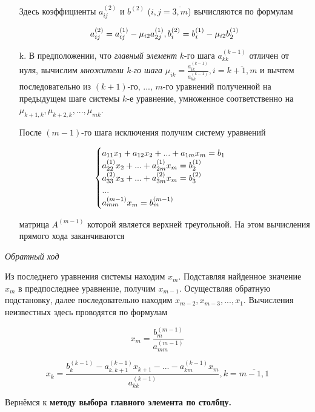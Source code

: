 \documentclass[__main__.tex]{subfiles}
\begin{document}
\begin{enumerate}
	Здесь коэффициенты $a^{(2)}_{i j}$ и $b^{(2)}$ ($i, j = \overline{3,m}$) вычисляются по формулам
	
	\begin{gather*}
		\llabel{1_5}
		a^{(2)}_{i j} = a_{i j}^{(1)} - \mu_{i 2} a_{2 j}^{(1)}, b_i^{(2)} = b_i^{(1)} - \mu_{i 2} b_2^{(1)}
	\end{gather*}
	
	\item[k.]
	В предположении, что \textit{главный элемент} $k$-го шага $a^{(k-1)}_{k k}$ отличен от нуля, вычислим \textit{множители k-го шага} $\mu_{i k} = \frac{a_{i k}^{(k-1)}}{a_{k k}^{(k-1)}}, i = \overline{k+1,m}$ и вычтем последовательно из $(k+1)$-го, ..., $m$-го уравнений полученной на предыдущем шаге системы $k$-е уравнение, умноженное соответственно на $\mu_{k+1, k}, \mu_{k+2, k}, ..., \mu_{m k}$.
	
	После $(m-1)$-го шага исключения получим систему уравнений 
	
	\begin{gather}
		\llabel{1_6}
		\begin{cases}
			a_{1 1} x_1 + a_{1 2} x_2 + ... + a_{1 m} x_m = b_1 \\
			a_{2 2}^{(1)} x_2 + ... + a_{2 m}^{(1)} x_m = b_2^{(1)} \\
			a^{(2)}_{3 3} x_3 + ... + a^{(2)}_{3 m} x_m = b_3^{(2)} \\
			... \\
			a^{(m-1)}_{m m} x_m = b_m^{(m-1)}
		\end{cases}
	\end{gather}
	
	матрица $A^{(m-1)}$ которой является верхней треугольной. На этом вычисления прямого хода заканчиваются
\end{enumerate}

\textit{Обратный ход}

Из последнего уравнения системы  находим $x_m$. Подставляя найденное значение $x_m$ в предпоследнее уравнение, получим $x_{m-1}$. Осуществляя обратную подстановку, далее последовательно находим $x_{m-2}, x_{m-3}, ..., x_1$. Вычисления неизвестных здесь проводятся по формулам

$$x_m = \frac{b_m^{(m-1)}}{a^{(m-1)}_{m m}}$$

$$x_k = \frac{b_k^{(k-1)} - a^{(k-1)}_{k, k + 1} x_{k + 1} - ... - a_{k m}^{(k-1)} x_m}{a_{k k}^{(k-1)}}, k = \overline{m-1, 1}$$

Вернёмся к \textbf{методу выбора главного элемента по столбцу.}
\end{document}
